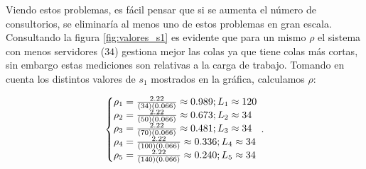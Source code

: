 \documentclass[10pt]{article}
\begin{document}
    Viendo estos problemas, es fácil pensar que si se aumenta el número de consultorios, se eliminaría al menos uno de estos problemas en gran escala. Consultando la figura \ref{fig:valores_s1} es evidente que para un mismo $\rho$ el sistema con menos servidores ($34$) gestiona mejor las colas ya que tiene colas más cortas, sin embargo estas mediciones son relativas a la carga de trabajo. Tomando en cuenta los distintos valores de $s_{1}$ mostrados en la gráfica, calculamos $\rho$:
    
    \begin{equation*}
    	\left\{
    	\begin{array}{@{}l@{}}
    		\rho_{1} = \frac{2.22}{(34)(0.066)} \approx 0.989 ; L_{1} \approx 120 \\
    		\rho_{2} = \frac{2.22}{(50)(0.066)} \approx 0.673 ; L_{2} \approx 34 \\
    		\rho_{3} = \frac{2.22}{(70)(0.066)} \approx 0.481 ; L_{3} \approx 34 \\
    		\rho_{4} = \frac{2.22}{(100)(0.066)} \approx 0.336 ; L_{4} \approx 34 \\
    		\rho_{5} = \frac{2.22}{(140)(0.066)} \approx 0.240 ; L_{5} \approx 34 \\
    	\end{array}
    	\right.\,.
    \end{equation*}
    
\end{document}
